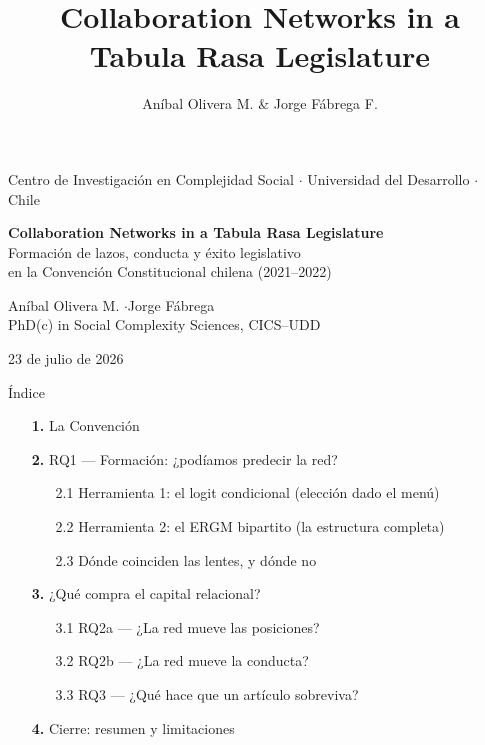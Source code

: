 \documentclass[aspectratio=169,11pt]{beamer}
\title{Collaboration Networks in a Tabula Rasa Legislature}
\author{Aníbal Olivera M. \& Jorge Fábrega F.}
\date{}
\begin{document}
\begin{frame}[plain]
  \vspace{0.6cm}
  \begin{center}
    {\footnotesize\color{ndgray} Centro de Investigación en Complejidad Social $\cdot$ Universidad del Desarrollo $\cdot$ Chile}
  \end{center}
  \vspace{1.0cm}
  \begin{center}
    {\LARGE \textbf{Collaboration Networks in a Tabula Rasa Legislature}}\\[0.5cm]
    {\large \color{ndreddark} Formación de lazos, conducta y éxito legislativo\\en la Convención Constitucional chilena (2021--2022)}
  \end{center}
  \vspace{1.1cm}
  \begin{center}
    {\normalsize Aníbal Olivera M. \quad$\cdot$\quad Jorge Fábrega}\\[2pt]
    {\footnotesize PhD(c) in Social Complexity Sciences, CICS--UDD}
  \end{center}
  \vfill
  \begin{center}
    {\scriptsize\color{ndgray} 23 de julio de 2026}
  \end{center}
\end{frame}

\begin{frame}{Índice}
\begin{itemize}
  \item[{\color{ndred}\textbf{1.}}] La Convención
  \item[{\color{ndred}\textbf{2.}}] RQ1 — Formación: ¿podíamos predecir la red?
  \begin{itemize}
    \item[{\color{ndred}2.1}] {\color{black}Herramienta 1: el logit condicional (elección dado el menú)}
    \item[{\color{ndred}2.2}] {\color{black}Herramienta 2: el ERGM bipartito (la estructura completa)}
    \item[{\color{ndred}2.3}] {\color{black}Dónde coinciden las lentes, y dónde no}
  \end{itemize}
  \item[{\color{ndred}\textbf{3.}}] ¿Qué compra el capital relacional?
  \begin{itemize}
    \item[{\color{ndred}3.1}] {\color{black}RQ2a — ¿La red mueve las posiciones?}
    \item[{\color{ndred}3.2}] {\color{black}RQ2b — ¿La red mueve la conducta?}
    \item[{\color{ndred}3.3}] {\color{black}RQ3 — ¿Qué hace que un artículo sobreviva?}
  \end{itemize}
  \item[{\color{ndred}\textbf{4.}}] Cierre: resumen y limitaciones
\end{itemize}
\end{frame}
\end{document}

